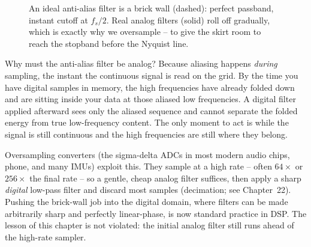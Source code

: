 \begin{figure}[H]
\centering
{}
\caption{An ideal anti-alias filter is a brick wall (dashed): perfect passband, instant
cutoff at $f_s/2$. Real analog filters (solid) roll off gradually, which is exactly why
we oversample -- to give the skirt room to reach the stopband before the Nyquist line.}
\label{ch18:fig-aaf}
\end{figure}

\begin{whybox}
Why must the anti-alias filter be analog? Because aliasing happens \emph{during}
sampling, the instant the continuous signal is read on the grid. By the time you have
digital samples in memory, the high frequencies have already folded down and are
sitting inside your data at those aliased low frequencies. A digital filter
applied afterward sees only the aliased sequence and cannot separate the folded energy from true low-frequency content. The only
moment to act is while the signal is still continuous and the high frequencies are
still where they belong.
\end{whybox}

\begin{applicationbox}
Oversampling converters (the sigma-delta ADCs in most modern audio chips,
phone, and many IMUs) exploit this. They sample at a high rate -- often
$64\times$ or $256\times$ the final rate -- so a gentle, cheap analog filter suffices,
then apply a sharp \emph{digital} low-pass filter and discard most samples
(decimation; see Chapter~22). Pushing the brick-wall job into the digital
domain, where filters can be made arbitrarily sharp and perfectly linear-phase, is now
standard practice in DSP. The lesson of this chapter is not violated: the
initial analog filter still runs ahead of the high-rate sampler.
\end{applicationbox}


